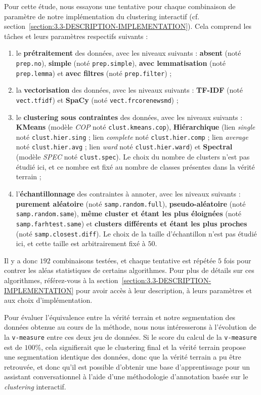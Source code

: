 			Pour cette étude, nous essayons une tentative pour chaque combinaison de paramètre de notre implémentation du clustering interactif (cf. section~\ref{section:3.3-DESCRIPTION-IMPLEMENTATION}). Cela comprend les tâches et leurs paramètres respectifs suivants :
			\begin{enumerate}
				\item le \textbf{prétraitement} des données, avec les niveaux suivants : \textbf{absent} (noté \texttt{prep.no}), \textbf{simple} (noté \texttt{prep.simple}), \textbf{avec lemmatisation} (noté \texttt{prep.lemma}) et \textbf{avec filtres} (noté \texttt{prep.filter}) ;
				\item la \textbf{vectorisation} des données, avec les niveaux suivants : \textbf{TF-IDF} (noté \texttt{vect.tfidf}) et \textbf{SpaCy} (noté \texttt{vect.frcorenewsmd}) ;
				\item le \textbf{clustering sous contraintes} des données, avec les niveaux suivants : \textbf{KMeans} (modèle \textit{COP} noté \texttt{clust.kmeans.cop}), \textbf{Hiérarchique} (lien \textit{single} noté \texttt{clust.hier.sing} ; lien \textit{complete} noté \texttt{clust.hier.comp} ; lien \textit{average} noté \texttt{clust.hier.avg} ; lien \textit{ward} noté \texttt{clust.hier.ward}) et \textbf{Spectral} (modèle \textit{SPEC} noté \texttt{clust.spec}). Le choix du nombre de clusters n'est pas étudié ici, et ce nombre est fixé au nombre de classes présentes dans la vérité terrain ;
				\item l'\textbf{échantillonnage} des contraintes à annoter, avec les niveaux suivants : \textbf{purement aléatoire} (noté \texttt{samp.random.full}), \textbf{pseudo-aléatoire} (noté \texttt{samp.random.same}), \textbf{même cluster et étant les plus éloignées} (noté \texttt{samp.farhtest.same}) et \textbf{clusters différents et étant les plus proches} (noté \texttt{samp.closest.diff}). Le choix de la taille d'échantillon n'est pas étudié ici, et cette taille est arbitrairement fixé à $50$.
			\end{enumerate}
			
			Il y a donc $192$ combinaisons testées, et chaque tentative est répétée $5$ fois pour contrer les aléas statistiques de certains algorithmes.
			Pour plus de détails sur ces algorithmes, référez-vous à la section~\ref{section:3.3-DESCRIPTION-IMPLEMENTATION} pour avoir accès à leur description, à leurs paramètres et aux choix d'implémentation.
			
			Pour évaluer l'équivalence entre la vérité terrain et notre segmentation des données obtenue au cours de la méthode, nous nous intéresserons à l'évolution de la \texttt{v-measure} entre ces deux jeu de données.
			Si le score du calcul de la \texttt{v-measure} est de $100$\%, cela signifierait que le clustering final et la vérité terrain propose une segmentation identique des données, donc que la vérité terrain a pu être retrouvée, et donc qu'il est possible d'obtenir une base d'apprentissage pour un assistant conversationnel à l'aide d'une méthodologie d'annotation basée sur le \textit{clustering} interactif.
			
